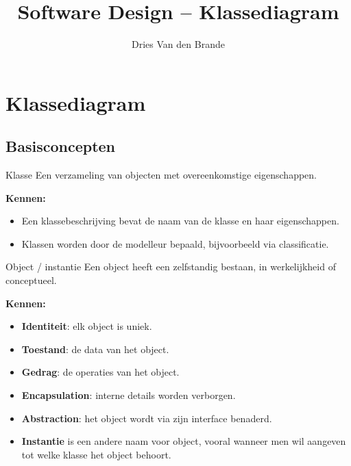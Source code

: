 \documentclass[11pt,a4paper]{article}
\title{Software Design -- Klassediagram}
\author{Dries Van den Brande}
\date{}
\begin{document}
\maketitle

\section{Klassediagram}

\subsection{Basisconcepten}

\begin{definition}{Klasse}
Een verzameling van objecten met overeenkomstige eigenschappen.

\textbf{Kennen:}
\begin{itemize}
    \item Een klassebeschrijving bevat de naam van de klasse en haar eigenschappen.
    \item Klassen worden door de modelleur bepaald, bijvoorbeeld via classificatie.
\end{itemize}
\end{definition}

\begin{definition}{Object / instantie}
Een object heeft een zelfstandig bestaan, in werkelijkheid of conceptueel.

\textbf{Kennen:}
\begin{itemize}
    \item \textbf{Identiteit}: elk object is uniek.
    \item \textbf{Toestand}: de data van het object.
    \item \textbf{Gedrag}: de operaties van het object.
    \item \textbf{Encapsulation}: interne details worden verborgen.
    \item \textbf{Abstraction}: het object wordt via zijn interface benaderd.
    \item \textbf{Instantie} is een andere naam voor object, vooral wanneer men wil aangeven tot welke klasse het object behoort.
\end{itemize}
\end{definition}
\end{document}
